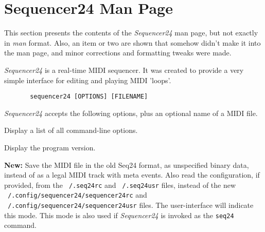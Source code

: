 %
%
%

\section{Sequencer24 Man Page}
\label{sec:seq24_man_page}

   This section presents the contents of the \textsl{Sequencer24} man page, but
   not exactly in \textsl{man} format.  Also, an item or two are shown that
   somehow didn't make it into the man page, and minor corrections and
   formatting tweaks were made.

   \textsl{Sequencer24} is a real-time MIDI sequencer. It was created to
   provide a very simple interface for editing and playing MIDI 'loops'.

   \begin{verbatim}
       sequencer24 [OPTIONS] [FILENAME]
   \end{verbatim}

   \textsl{Sequencer24} accepts the following options, plus an optional name of a
   MIDI file.

   \setcounter{ItemCounter}{0}      %

      Display a list of all command-line options.

      Display the program version.

      \textbf{New:}
      Save the MIDI file in the old Seq24 format, as unspecified
      binary data, instead of as a legal MIDI track with meta events.
      Also read the configuration, if provided, from the
      \texttt{~/.seq24rc} and \texttt{~/.seq24usr} files,
      instead of the new
      \texttt{~/.config/sequencer24/sequencer24rc} and
      \texttt{~/.config/sequencer24/sequencer24usr} files.
      The user-interface will indicate this mode.  This mode is also
      used if \textsl{Sequencer24} is invoked as the
      \texttt{seq24} command.

